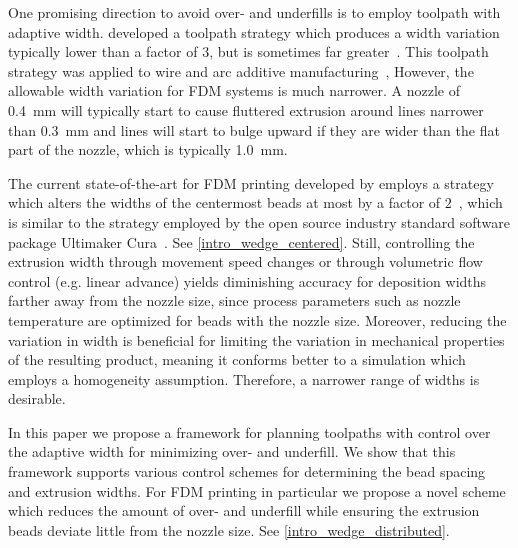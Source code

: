One promising direction to avoid over- and underfills is to employ toolpath with adaptive width.
\citeauthor{Ding2016a} developed a toolpath strategy which produces a width variation typically lower than a factor of $3$, but is sometimes far greater~\cite{Ding2016a}. This toolpath strategy was applied to wire and arc additive manufacturing~\cite{Ding2014,Xiong2019},
However, the allowable width variation for FDM systems is much narrower.
A nozzle of \SI{0.4}{\milli\meter} will typically start to cause fluttered extrusion around lines narrower than \SI{0.3}{\milli\meter} and lines will start to bulge upward if they are wider than the flat part of the nozzle, which is typically \SI{1.0}{\milli\meter}.

The current state-of-the-art for FDM printing developed by \citeauthor{Jin2017JMS} employs a strategy which alters the widths of the centermost beads at most by a factor of $2$~\cite{Jin2017JMS},
which is similar to the strategy employed by the open source industry standard software package Ultimaker Cura~\cite{cura}.
See \cref{intro_wedge_centered}.
Still, controlling the extrusion width through movement speed changes or through volumetric flow control (e.g. linear advance) yields diminishing accuracy for deposition widths farther away from the nozzle size,
since process parameters such as nozzle temperature are optimized for beads with the nozzle size.
Moreover, reducing the variation in width is beneficial for limiting the variation in mechanical properties of the resulting product, meaning it conforms better to a simulation which employs a homogeneity assumption.
Therefore, a narrower range of widths is desirable.

In this paper we propose a framework for planning toolpaths with control over the adaptive width for minimizing over- and underfill. 
We show that this framework supports various control schemes for determining the bead spacing and extrusion widths. 
For FDM printing in particular we propose a novel scheme which reduces the amount of over- and underfill while ensuring the extrusion beads deviate little from the nozzle size.
See \cref{intro_wedge_distributed}. 


